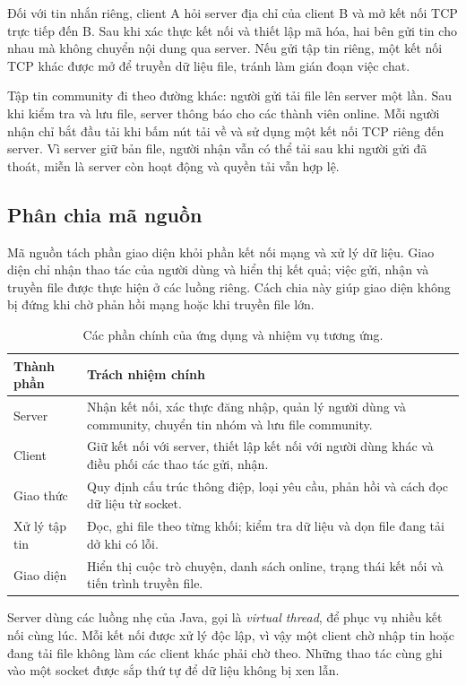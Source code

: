 Đối với tin nhắn riêng, client A hỏi server địa chỉ của client B và mở kết nối
TCP trực tiếp đến B. Sau khi xác thực kết nối và thiết lập mã hóa, hai bên gửi
tin cho nhau mà không chuyển nội dung qua server. Nếu gửi tập tin riêng, một
kết nối TCP khác được mở để truyền dữ liệu file, tránh làm gián đoạn việc chat.

Tập tin community đi theo đường khác: người gửi tải file lên server một lần.
Sau khi kiểm tra và lưu file, server thông báo cho các thành viên online.
Mỗi người nhận chỉ bắt đầu tải khi bấm nút tải về và sử dụng một kết nối TCP
riêng đến server. Vì server giữ bản file, người nhận vẫn có thể tải sau khi
người gửi đã thoát, miễn là server còn hoạt động và quyền tải vẫn hợp lệ.

\subsection{Phân chia mã nguồn}

Mã nguồn tách phần giao diện khỏi phần kết nối mạng và xử lý dữ liệu.
Giao diện chỉ nhận thao tác của người dùng và hiển thị kết quả; việc gửi, nhận
và truyền file được thực hiện ở các luồng riêng. Cách chia này giúp giao diện
không bị đứng khi chờ phản hồi mạng hoặc khi truyền file lớn.

\begin{table}[H]
\centering\small
\begin{tabularx}{\linewidth}{p{3.2cm} >{\raggedright\arraybackslash}X}
\toprule
Thành phần & Trách nhiệm chính \\
\midrule
Server & Nhận kết nối, xác thực đăng nhập, quản lý người dùng và community, chuyển tin nhóm và lưu file community. \\
Client & Giữ kết nối với server, thiết lập kết nối với người dùng khác và điều phối các thao tác gửi, nhận. \\
Giao thức & Quy định cấu trúc thông điệp, loại yêu cầu, phản hồi và cách đọc dữ liệu từ socket. \\
Xử lý tập tin & Đọc, ghi file theo từng khối; kiểm tra dữ liệu và dọn file đang tải dở khi có lỗi. \\
Giao diện & Hiển thị cuộc trò chuyện, danh sách online, trạng thái kết nối và tiến trình truyền file. \\
\bottomrule
\end{tabularx}
\caption{Các phần chính của ứng dụng và nhiệm vụ tương ứng.}
\end{table}

Server dùng các luồng nhẹ của Java, gọi là \emph{virtual thread}, để phục vụ
nhiều kết nối cùng lúc. Mỗi kết nối được xử lý độc lập, vì vậy một client chờ
nhập tin hoặc đang tải file không làm các client khác phải chờ theo.
Những thao tác cùng ghi vào một socket được sắp thứ tự để dữ liệu không bị xen lẫn.

